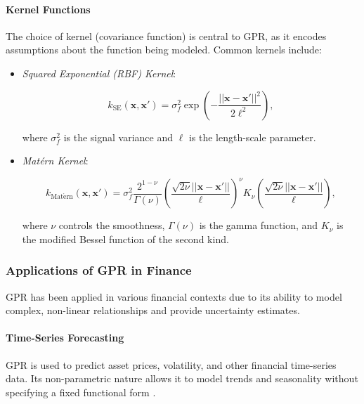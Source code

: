 \paragraph{Kernel Functions}

The choice of kernel (covariance function) is central to GPR, as it encodes assumptions about the function being modeled. Common kernels include:

\begin{itemize}
    \item \textit{Squared Exponential (RBF) Kernel}:

    \begin{equation}
    k_{\mathrm{SE}}(\mathbf{x}, \mathbf{x}') = \sigma_f^2 \exp\left( -\frac{||\mathbf{x} - \mathbf{x}'||^2}{2 \ell^2} \right),
    \end{equation}

    where $\sigma_f^2$ is the signal variance and $\ell$ is the length-scale parameter.

    \item \textit{Matérn Kernel}:

    \begin{equation}
    k_{\mathrm{Mat\acute{e}rn}}(\mathbf{x}, \mathbf{x}') = \sigma_f^2 \frac{2^{1 - \nu}}{\Gamma(\nu)} \left( \frac{\sqrt{2\nu} ||\mathbf{x} - \mathbf{x}'||}{\ell} \right)^\nu K_\nu \left( \frac{\sqrt{2\nu} ||\mathbf{x} - \mathbf{x}'||}{\ell} \right),
    \end{equation}

    where $\nu$ controls the smoothness, $\Gamma(\nu)$ is the gamma function, and $K_\nu$ is the modified Bessel function of the second kind.
\end{itemize}

\subsubsection{Applications of GPR in Finance}

GPR has been applied in various financial contexts due to its ability to model complex, non-linear relationships and provide uncertainty estimates.

\paragraph{Time-Series Forecasting}

GPR is used to predict asset prices, volatility, and other financial time-series data. Its non-parametric nature allows it to model trends and seasonality without specifying a fixed functional form \cite{cao2018financial}.


